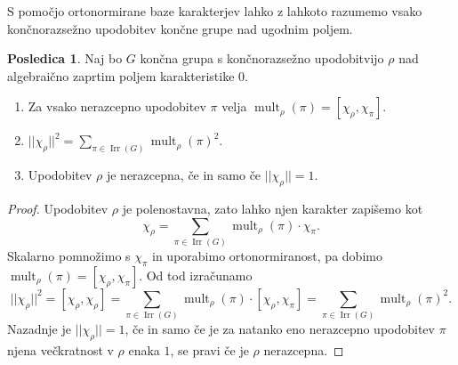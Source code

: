 \documentclass[11pt]{book}
\DeclareMathOperator\mult{mult}
\DeclareMathOperator\Irr{Irr}
\theoremstyle{definition}
\theoremstyle{zgled}
\theoremstyle{odprtproblem}
\theoremstyle{domacanaloga}
\newenvironment{dokaz}
    {\color{siva}\begin{proof}}
    {\end{proof}}
\theoremstyle{izrek}
\newtheorem*{posledica}{Posledica}
\begin{document}
S pomočjo ortonormirane baze karakterjev lahko z lahkoto razumemo vsako končnorazsežno upodobitev končne grupe nad ugodnim poljem.

\begin{posledica}
Naj bo $G$ končna grupa s končnorazsežno upodobitvijo $\rho$ nad algebraično zaprtim poljem karakteristike $0$. 
\begin{enumerate}
    \item Za vsako nerazcepno upodobitev $\pi$ velja $\mult_{\rho}(\pi) = [ \chi_{\rho}, \chi_{\pi} ]$.
    \item $|| \chi_{\rho} ||^2 = \sum_{\pi \in \Irr(G)} \mult_{\rho}(\pi)^2$.
    \item Upodobitev $\rho$ je nerazcepna, če in samo če $|| \chi_{\rho} || = 1$.
\end{enumerate}
\end{posledica}
\begin{dokaz}
Upodobitev $\rho$ je polenostavna, zato lahko njen karakter zapišemo kot
\[
    \chi_{\rho} = \sum_{\pi \in \Irr(G)} \mult_{\rho}(\pi) \cdot \chi_{\pi}.
\]
Skalarno pomnožimo s $\chi_{\pi}$ in uporabimo ortonormiranost, pa dobimo $\mult_{\rho}(\pi) = [ \chi_{\rho}, \chi_{\pi} ]$. Od tod izračunamo
\[
    ||\chi_{\rho}||^2 = [ \chi_{\rho}, \chi_{\rho} ] 
    = \sum_{\pi \in \Irr(G)} \mult_{\rho}(\pi) \cdot [ \chi_{\rho}, \chi_{\pi} ] 
    = \sum_{\pi \in \Irr(G)} \mult_{\rho}(\pi)^2.
\]
Nazadnje je $||\chi_{\rho}|| = 1$, če in samo če je za natanko eno nerazcepno upodobitev $\pi$ njena večkratnost v $\rho$ enaka $1$, se pravi če je $\rho$ nerazcepna.
\end{dokaz}
\end{document}
